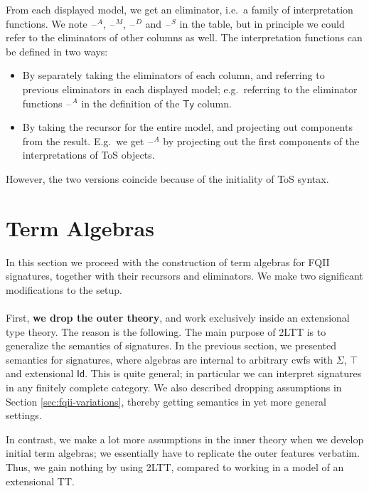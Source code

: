 \documentclass[12pt,a4paper,twoside,openany]{book}
\theoremstyle{remark}
\theoremstyle{definition}
\theoremstyle{theorem}
\newcommand{\Ty}{\mathsf{Ty}}
\newcommand{\Id}{\mathsf{Id}}
\newcommand{\blank}{\mathord{\hspace{1pt}\text{--}\hspace{1pt}}}
\begin{document}
From each displayed model, we get an eliminator, i.e.\ a family of
interpretation functions. We note $\blank^A$, $\blank^M$, $\blank^D$ and
$\blank^S$ in the table, but in principle we could refer to the eliminators of
other columns as well. The interpretation functions can be defined in two ways:
\begin{itemize}
\item By separately taking the eliminators of each column, and referring to previous
      eliminators in each displayed model; e.g.\ referring to the eliminator functions $\blank^A$ in
      the definition of the $\Ty$ column.
\item By taking the recursor for the entire model, and projecting out components from the result. E.g.\
      we get $\blank^A$ by projecting out the first components of the interpretations of ToS objects.
\end{itemize}
However, the two versions coincide because of the initiality of ToS syntax.


\section{Term Algebras}
\label{sec:fqiit-term-algebras}

In this section we proceed with the construction of term algebras for FQII
signatures, together with their recursors and eliminators. We make two
significant modifications to the setup.
\\\\
\indent First, \textbf{we drop the outer theory}, and work exclusively inside an
extensional type theory. The reason is the following. The main purpose of 2LTT
is to generalize the semantics of signatures. In the previous section, we
presented semantics for signatures, where algebras are internal to arbitrary
cwfs with $\Sigma$, $\top$ and extensional $\Id$. This is quite general; in
particular we can interpret signatures in any finitely complete category. We
also described dropping assumptions in Section \ref{sec:fqii-variations},
thereby getting semantics in yet more general settings.

In contrast, we make a lot more assumptions in the inner theory when we develop
initial term algebras; we essentially have to replicate the outer features
verbatim.  Thus, we gain nothing by using 2LTT, compared to working in a model
of an extensional TT.
\end{document}
